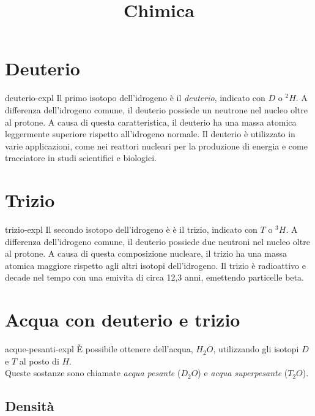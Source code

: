 \documentclass[preview]{standalone}
\begin{document}
\title{Chimica}
\genpage

\section{Deuterio}

\begin{snippet}{deuterio-expl}
Il primo isotopo dell'idrogeno è il \textit{deuterio}, indicato con \(D\) o \(^2H\).
A differenza dell'idrogeno comune, il deuterio possiede un neutrone nel nucleo oltre al protone.
A causa di questa caratteristica, il deuterio ha una massa atomica leggermente superiore rispetto all'idrogeno normale.
Il deuterio è utilizzato in varie applicazioni, come nei reattori nucleari per la produzione di energia e come tracciatore in studi scientifici e biologici. 
\end{snippet}

\section{Trizio}

\begin{snippet}{trizio-expl}
Il secondo isotopo dell'idrogeno è è il trizio, indicato con \(T\) o \(^3H\).
A differenza dell'idrogeno comune, il deuterio possiede due neutroni nel nucleo oltre al protone.
A causa di questa composizione nucleare, il trizio ha una massa atomica maggiore rispetto agli altri isotopi dell'idrogeno.
Il trizio è radioattivo e decade nel tempo con una emivita di circa 12,3 anni, emettendo particelle beta.
\end{snippet}

\section{Acqua con deuterio e trizio}

\begin{snippet}{acque-pesanti-expl}
È possibile ottenere dell'acqua, \(H_2O\), utilizzando gli isotopi \(D\) e \(T\) al posto di \(H\).
\\
Queste sostanze sono chiamate \textit{acqua pesante} (\(D_2O\)) e
\textit{acqua superpesante} (\(T_2O\)).
\end{snippet}

\subsection{Densità}
\end{document}
